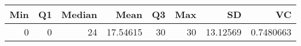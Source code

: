 
\begin{tabular}[t]{rrrrrrrr}
\toprule
Min & Q1 & Median & Mean & Q3 & Max & SD & VC\\
\midrule
0 & 0 & 24 & 17.54615 & 30 & 30 & 13.12569 & 0.7480663\\
\bottomrule
\end{tabular}